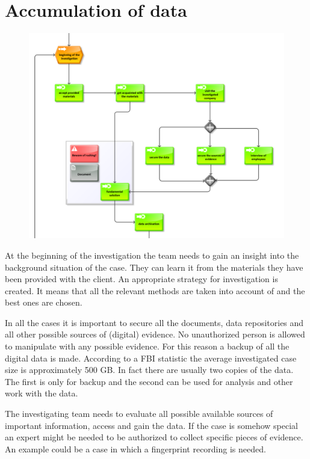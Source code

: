 \section{Accumulation of data}
\begin{figure}[bh!t]
	\begin{center} 
	\includegraphics[width=1.0\textwidth]{img/metodika/metodika2.pdf}
	\end{center}
\end{figure}
At the beginning of the investigation the team needs to gain an insight into the background situation of the case. They can learn it from the materials they have been provided with the client. An appropriate strategy for investigation is created. It means that all the relevant methods are taken into account of and the best ones are chosen. 

In all the cases it is important to secure all the documents, data repositories and all other possible sources of (digital) evidence. No unauthorized person is allowed to manipulate with any possible evidence. For this reason a backup of all the digital data is made. According to a FBI statistic the average investigated case size is approximately 500 GB. \cite{ariu} In fact there are usually two copies of the data. The first is only for backup and the second can be used for analysis and other work with the data. 

The investigating team needs to evaluate all possible available sources of important information, access and gain the data. If the case is somehow special an expert might be needed to be authorized to collect specific pieces of evidence. An example could be a case in which a fingerprint recording is needed. 

